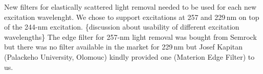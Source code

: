New filters for elastically scattered light removal needed to be used for each
new excitation wavelenght. We chose to support excitations at 257 and 229\,nm
on top of the 244-nm excitation.
\MISSING \{discussion about usability of different excitation wavelengths\}
The edge filter for 257-nm light removal was bought from Semrock but there was
no filter available in the market for 229\,nm but Josef Kapitan (Palackeho
University, Olomouc) kindly provided one (Materion Edge Filter) to us.
